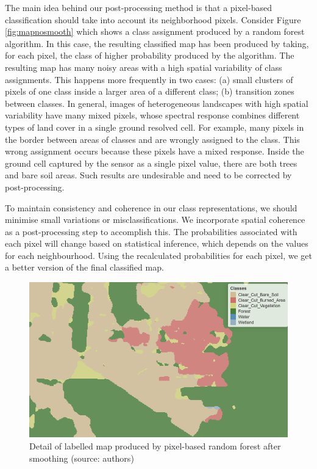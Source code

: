 \documentclass[
  shortnames]{jss}
\begin{document}
The main idea behind our post-processing method is that a pixel-based classification should take into account its neighborhood pixels. Consider Figure \ref{fig:mapnosmooth} which shows a class assignment produced by a random forest algorithm. In this case, the resulting classified map has been produced by taking, for each pixel, the class of higher probability produced by the algorithm. The resulting map has many noisy areas with a high spatial variability of class assignments. This happens more frequently in two cases: (a) small clusters of pixels of one class inside a larger area of a different class; (b) transition zones between classes. In general, images of heterogeneous landscapes with high spatial variability have many mixed pixels, whose spectral response combines different types of land cover in a single ground resolved cell. For example, many pixels in the border between areas of classes  and  are wrongly assigned to the  class. This wrong assignment occurs because these pixels have a mixed response. Inside the ground cell captured by the sensor as a single pixel value, there are both trees and bare soil areas. Such results are undesirable and need to be corrected by post-processing.

To maintain consistency and coherence in our class representations, we should minimise small variations or misclassifications. We incorporate spatial coherence as a post-processing step to accomplish this. The probabilities associated with each pixel will change based on statistical inference, which depends on the values for each neighbourhood. Using the recalculated probabilities for each pixel, we get a better version of the final classified map.

\begin{CodeChunk}
\begin{figure}[!h]

{\centering \includegraphics[width=0.7\linewidth]{images/map_smooth_v2} 

}

\caption[Detail of labelled map produced by pixel-based random forest after smoothing (source]{Detail of labelled map produced by pixel-based random forest after smoothing (source: authors)}\label{fig:mapsmooth}
\end{figure}
\end{CodeChunk}
\end{document}
